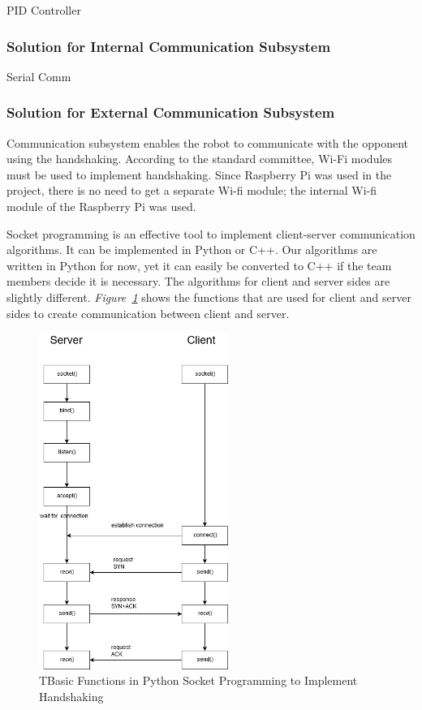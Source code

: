\documentclass[a4paper,12pt]{article}
\begin{document}
			PID Controller
		
		\subsubsection{Solution for Internal Communication Subsystem}
		
			Serial Comm
			
		\subsubsection{Solution for External Communication Subsystem}
		
			Communication subsystem enables the robot to communicate with the opponent using the handshaking. According to the standard committee, Wi-Fi modules must be used to implement handshaking. Since Raspberry Pi was used in the project, there is no need to get a separate Wi-fi module; the internal Wi-fi module of the Raspberry Pi was used. 
			
			Socket programming is an effective tool to implement client-server communication algorithms. It can be implemented in Python or C++.  Our algorithms are written in Python for now, yet it can easily be converted to C++ if the team members decide it is necessary. The algorithms for client and server sides are slightly different. \textit{Figure~\ref{fig:socket_funcs}} shows the functions that are used for client and server sides to create communication between client and server.
			
			
			\begin{figure}[H]
				\center
				\setlength{\unitlength}{\textwidth} 
				\includegraphics[width=0.55\textwidth]{images/socket_funcs}
				\caption{\label{fig:socket_funcs}TBasic Functions in Python Socket Programming to Implement Handshaking}
			\end{figure}
\end{document}

